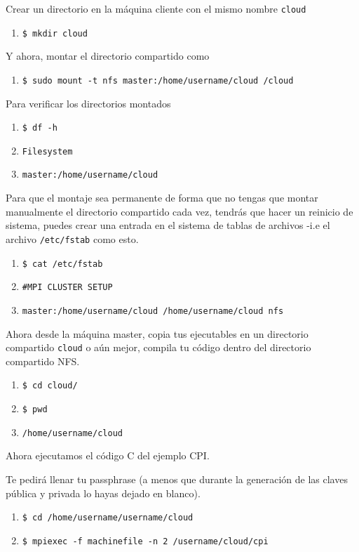 \documentclass[conference]{IEEEtran}
\begin{document}
Crear un directorio en la máquina cliente con el mismo nombre \texttt{cloud}
\begin{enumerate}
  \item[] \texttt{\$ mkdir cloud}
\end{enumerate}

Y ahora, montar el directorio compartido como
\begin{enumerate}
  \item[] \texttt{\$ sudo mount -t nfs master:/home/username/cloud \texttildelow/cloud}
\end{enumerate}

Para verificar los directorios montados
\begin{enumerate}
  \item[] \texttt{\$ df -h}
  \item[] \texttt{Filesystem}
  \item[] \texttt{master:/home/username/cloud}
\end{enumerate}

Para que el montaje sea permanente de forma que no tengas que montar manualmente
el directorio compartido cada vez, tendrás que hacer un reinicio de sistema, puedes
crear una entrada en el sistema de tablas de archivos -i.e el archivo \texttt{/etc/fstab}
como esto.
\begin{enumerate}
  \item[] \texttt{\$ cat /etc/fstab}
  \item[] \texttt{\#MPI CLUSTER SETUP}
  \item[] \texttt{master:/home/username/cloud /home/username/cloud nfs}
\end{enumerate}

Ahora desde la máquina master, copia tus ejecutables en un directorio compartido
\texttt{cloud} o aún mejor, compila tu código dentro del directorio compartido NFS.
\begin{enumerate}
  \item[] \texttt{\$ cd cloud/}
  \item[] \texttt{\$ pwd}
  \item[] \texttt{/home/username/cloud}
\end{enumerate}

Ahora ejecutamos el código C del ejemplo CPI.

Te pedirá llenar tu passphrase (a menos que durante la generación de
las claves pública y privada lo hayas dejado en blanco).
\begin{enumerate}
  \item[] \texttt{\$ cd /home/username/username/cloud}
  \item[] \texttt{\$ mpiexec -f machinefile -n 2 \texttildelow/username/cloud/cpi}
\end{enumerate}
\end{document}
